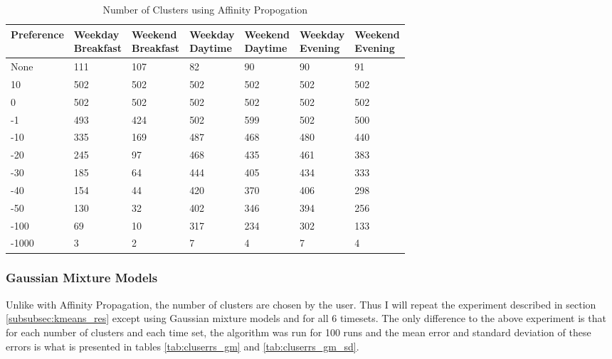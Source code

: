 \documentclass[a4paper]{article}
\begin{document}
\begin{table}
\centering
\begin{tabular}{|l|l|l|l|l|l|l|}
\hline
\textbf{Preference} & \thead{\textbf{Weekday} \\ \textbf{Breakfast}} &\thead{\textbf{Weekend} \\ \textbf{ Breakfast}} &\thead{\textbf{Weekday} \\ \textbf{Daytime}} &\thead{\textbf{Weekend} \\ \textbf{Daytime}} &\thead{\textbf{Weekday} \\ \textbf{Evening}} &\thead{\textbf{Weekend} \\ \textbf{Evening}} \\
\hline
None & 111 & 107 & 82 &90 &90 &91\\
\hline
10  & 502 & 502& 502& 502& 502& 502\\
\hline
0 & 502& 502& 502& 502& 502& 502\\
\hline
-1 & 493& 424& 502& 599& 502& 500\\
\hline
-10 & 335& 169& 487& 468& 480& 440\\
\hline
-20 &245 &97 &468 & 435& 461&383\\
\hline
-30 &185 &64 &444 &405 &434 &333\\
\hline
-40 &154 &44 & 420&370 & 406&298\\
\hline
-50 &130 &32 & 402& 346& 394&256\\
\hline
-100 &69 & 10&317 &234 &302 &133\\
\hline
-1000 &3 & 2& 7& 4& 7&4\\
\hline
\end{tabular}
\caption{Number of Clusters using Affinity Propogation}
\label{tab:affprop}
\end{table}


\subsubsection{Gaussian Mixture Models} \label{subsubsec:gm_res}
Unlike with Affinity Propagation, the number of clusters are chosen by the user. Thus I will repeat the experiment described in section \ref{subsubsec:kmeans_res} except using Gaussian mixture models and for all 6 timesets. The only difference to the above experiment is that for each number of clusters and each time set, the algorithm was run for 100 runs and the mean error and standard deviation of these errors is what is presented in tables \ref{tab:cluserrs_gm} and \ref{tab:cluserrs_gm_sd}.
\end{document}

